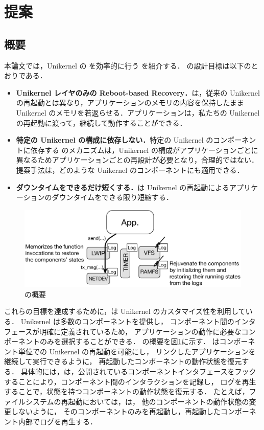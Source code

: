 \section{提案} \label{sec:proposal}

\subsection{概要}

本論文では，Unikernel の \rr を効率的に行う \emph{\sysname}を紹介する．
\sysname の設計目標は以下のとおりである．

\begin{itemize}
    \item \textbf{Unikernel レイヤのみの Reboot-based Recovery．}{\sysname は，従来の Unikernel の再起動とは異なり，アプリケーションのメモリの内容を保持したまま Unikernel のメモリを若返らせる．アプリケーションは，私たちの Unikernel の再起動に渡って，継続して動作することができる．}
    \item \textbf{特定の Unikernel の構成に依存しない．}{特定の Unikernel のコンポーネントに依存する \rr のメカニズムは，Unikernel の構成がアプリケーションごとに異なるためアプリケーションごとの再設計が必要となり，合理的ではない．提案手法は，どのような Unikernel のコンポーネントにも適用できる．}
    \item \textbf{ダウンタイムをできるだけ短くする．}{\sysname は Unikernel の再起動によるアプリケーションのダウンタイムをできる限り短縮する．}
\end{itemize}

\begin{figure}[t]
    \begin{center}
      \includegraphics[scale=0.3]{./img/vampos.eps}
      \caption{{\sysname} の概要} 
      \label{fig:overview}
    \end{center}
\end{figure}

これらの目標を達成するために，\sysname は Unikernel のカスタマイズ性を利用している．
Unikernel は多数のコンポーネントを提供し，
コンポーネント間のインタフェースが明確に定義されているため，
アプリケーションの動作に必要なコンポーネントのみを選択することができる．
\sysname の概要を図\ref{fig:overview}に示す．
\sysname はコンポーネント単位での Unikernel の再起動を可能にし，
リンクしたアプリケーションを継続して実行できるように，
再起動したコンポーネントの動作状態を復元する．
具体的には，\sysname は，公開されているコンポーネントインタフェースをフックすることにより，コンポーネント間のインタラクションを記録し，
ログを再生することで，状態を持つコンポーネントの動作状態を復元する．
たとえば，ファイルシステムの再起動においては，\sysname は，
他のコンポーネントの動作状態の変更しないように，
そのコンポーネントのみを再起動し，再起動したコンポーネント内部でログを再生する．

